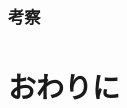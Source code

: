 \documentclass[T,J]{fose} %
\begin{document}


\subsubsection{考察}



\section{おわりに}







\end{document}
